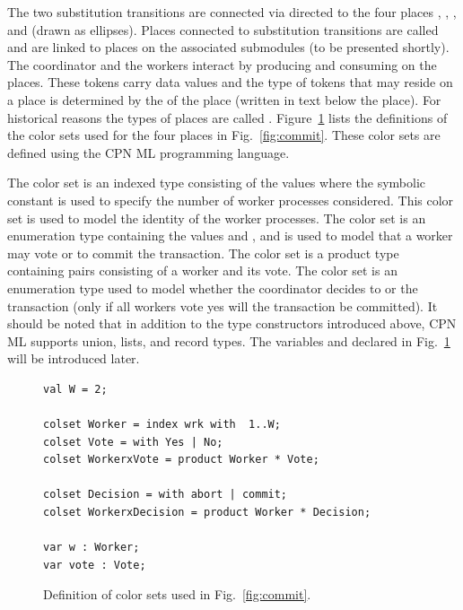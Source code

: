 The two substitution transitions are connected via directed
 to the four places ,
, , and  (drawn
as ellipses). Places connected to substitution transitions are called
 and are linked to  places on the
associated submodules (to be presented shortly). The coordinator and
the workers interact by producing and consuming  on
the places. These tokens carry data values and the type of tokens that
may reside on a place is determined by the  of the place
(written in text below the place). For historical reasons the types of
places are called . Figure~\ref{fig:coloursets}
lists the definitions of the color sets used for the four places in
Fig.~\ref{fig:commit}. These color sets are defined using the CPN ML
programming language.

The  color set is an indexed type consisting of the
values  where the symbolic constant
 is used to specify the number of worker processes
considered. This color set is used to model the identity of the worker
processes. The color set  is an enumeration type
containing the values  and , and is used to
model that a worker may vote  or  to commit
the transaction. The color set  is a product type
containing pairs consisting of a worker and its vote. The color set
 is an enumeration type used to model whether the
coordinator decides to  or  the
transaction (only if all workers vote yes will the transaction be
committed). It should be noted that in addition to the type
constructors introduced above, CPN ML supports union, lists, and
record types. The variables  and  declared in
Fig.~\ref{fig:coloursets} will be introduced later.

\begin{figure}[]
\begin{verbatim}
val W = 2;

colset Worker = index wrk with  1..W;
colset Vote = with Yes | No;
colset WorkerxVote = product Worker * Vote;

colset Decision = with abort | commit;
colset WorkerxDecision = product Worker * Decision;

var w : Worker;
var vote : Vote;
\end{verbatim}
\caption{Definition of color sets used in Fig.~\ref{fig:commit}.}
\label{fig:coloursets}
\end{figure}


